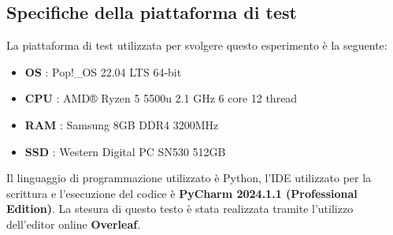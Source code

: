 \subsection{Specifiche della piattaforma di test}
La piattaforma di test utilizzata per svolgere questo esperimento è la seguente:
\begin{itemize}
    \item \textbf{OS} : Pop!\_OS 22.04 LTS 64-bit
    \item \textbf{CPU} : AMD® Ryzen 5 5500u 2.1 GHz 6 core 12 thread
    \item \textbf{RAM} : Samsung 8GB DDR4 3200MHz
    \item \textbf{SSD} : Western Digital PC SN530 512GB 
\end{itemize}
Il linguaggio di programmazione utilizzato è Python, l'IDE utilizzato per la scrittura e l'esecuzione del codice è \textbf{PyCharm 2024.1.1 (Professional Edition)}. La stesura di questo testo è stata realizzata tramite l'utilizzo dell'editor online \textbf{Overleaf}.